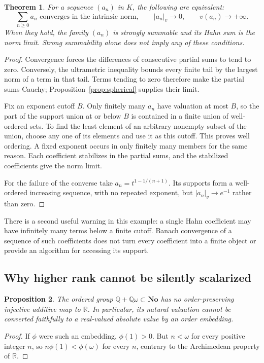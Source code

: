 \documentclass[11pt,a4paper]{article}
\numberwithin{equation}{section}
\newtheorem{theorem}{Theorem}[section]
\newtheorem{proposition}[theorem]{Proposition}
\theoremstyle{definition}
\theoremstyle{remark}
\newcommand{\No}{\mathbf{No}}
\newcommand{\R}{\mathbb R}
\newcommand{\Q}{\mathbb Q}
\newcommand{\vabs}[1]{\lvert#1\rvert_v}
\begin{document}
\begin{theorem}\label{thm:series}
For a sequence $(a_n)$ in $K$, the following are equivalent:
\[
 \sum_{n\ge0}a_n\text{ converges in the intrinsic norm},
 \qquad \vabs{a_n}\longrightarrow0,
 \qquad v(a_n)\longrightarrow+\infty.
\]
When they hold, the family $(a_n)$ is strongly summable and its Hahn sum is the
norm limit. Strong summability alone does not imply any of these conditions.
\end{theorem}
\begin{proof}
Convergence forces the differences of consecutive partial sums to tend to zero.
Conversely, the ultrametric inequality bounds every finite tail by the largest
norm of a term in that tail. Terms tending to zero therefore make the partial
sums Cauchy; Proposition~\ref{prop:spherical} supplies their limit.

Fix an exponent cutoff $B$. Only finitely many $a_n$ have valuation at most
$B$, so the part of the support union at or below $B$ is contained in a finite
union of well-ordered sets. To find the least element of an arbitrary nonempty
subset of the union, choose any one of its elements and use it as this cutoff.
This proves well ordering. A fixed exponent occurs in only finitely many
members for the same reason. Each coefficient stabilizes in the partial sums,
and the stabilized coefficients give the norm limit.

For the failure of the converse take $a_n=t^{1-1/(n+1)}$. Its supports form a
well-ordered increasing sequence, with no repeated exponent, but
$\vabs{a_n}\to e^{-1}$ rather than zero.
\end{proof}

There is a second useful warning in this example: a single Hahn coefficient may
have infinitely many terms below a finite cutoff. Banach convergence of a
sequence of such coefficients does not turn every coefficient into a finite
object or provide an algorithm for accessing its support.

\subsection{Why higher rank cannot be silently scalarized}
\begin{proposition}\label{prop:rankobstruction}
The ordered group $\Q+\Q\omega\subset\No$ has no order-preserving injective
additive map to $\R$. In particular, its natural valuation cannot be converted
faithfully to a real-valued absolute value by an order embedding.
\end{proposition}
\begin{proof}
If $\phi$ were such an embedding, $\phi(1)>0$. But $n<\omega$ for every
positive integer $n$, so $n\phi(1)<\phi(\omega)$ for every $n$, contrary to the
Archimedean property of $\R$.
\end{proof}
\end{document}
